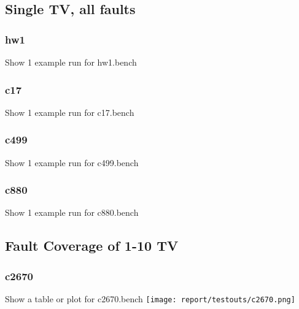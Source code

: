 \documentclass{article}
\begin{document}
            \subsection{Single TV, all faults}
                \subsubsection{hw1}
                Show 1 example run for hw1.bench

                \subsubsection{c17}
                Show 1 example run for c17.bench

                \subsubsection{c499}
                Show 1 example run for c499.bench

                \subsubsection{c880}
                Show 1 example run for c880.bench

            
            \subsection{Fault Coverage of 1-10 TV}
                \subsubsection{c2670}
                Show a table or plot for c2670.bench
                \texttt{[image: report/testouts/c2670.png]}
\end{document}
